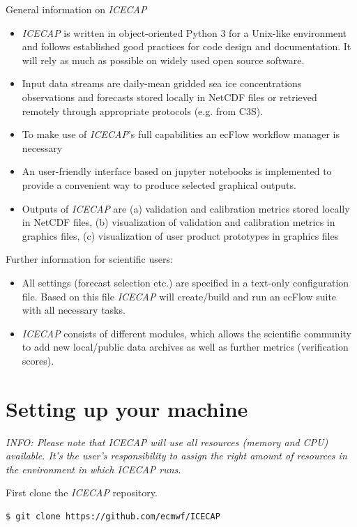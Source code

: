 \documentclass[DIV=10, parskip=full]{scrreprt}
\newcommand{\ice}{\textit{ICECAP}\xspace}
\newcommand{\info}[1]{\textit{INFO: #1}}
\begin{document}
General information on \ice
\begin{itemize}
	\item \ice is written in object-oriented Python 3 for a Unix-like environment and follows established good practices for code design and documentation. It will rely as much as possible on widely used open source software.
	\item Input data streams are daily-mean gridded sea ice concentrations observations and forecasts stored locally in NetCDF files or retrieved remotely through appropriate protocols (e.g. from C3S).
	\item To make use of \ice's full capabilities an ecFlow workflow manager is necessary
	\item An user-friendly interface based on jupyter notebooks is implemented to provide a convenient way to
	 produce selected graphical outputs. 
	\item Outputs of \ice are (a) validation and calibration metrics stored locally in NetCDF files, (b) visualization of validation and calibration metrics in graphics files, (c) visualization of user product prototypes in graphics files
\end{itemize}

Further information for scientific users:
\begin{itemize}
	\item All settings (forecast selection etc.) are specified in a text-only configuration file. Based on this file \ice will create/build and run an ecFlow suite  with all necessary tasks.
	\item \ice consists of different modules, which allows the scientific community to add new local/public data archives as well as further metrics (verification scores).
\end{itemize}



\FloatBarrier
\section{Setting up your machine}\label{sec:setup}

\info{Please note that \ice will use all resources (memory and CPU) available. It's the user's responsibility to assign the right amount of resources in the environment in which \ice runs.}

First clone the \ice repository.
\begin{lstlisting}[language=bash]
	$ git clone https://github.com/ecmwf/ICECAP
\end{lstlisting}
\end{document}
